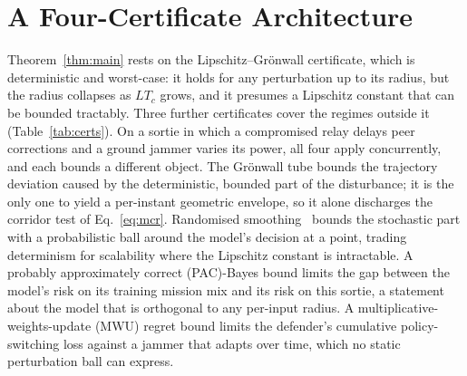 \documentclass[conference,letterpaper,10pt]{IEEEtran}   %
\begin{document}
\section{A Four-Certificate Architecture}
\label{sec:certs}
Theorem~\ref{thm:main} rests on the Lipschitz--Gr\"onwall certificate, which is
deterministic and worst-case: it holds for any perturbation up to its radius,
but the radius collapses as $LT_c$ grows, and it presumes a Lipschitz constant
that can be bounded tractably. Three further certificates cover the regimes
outside it (Table~\ref{tab:certs}). On a sortie in which a compromised relay
delays peer corrections and a ground jammer varies its power, all four apply
concurrently, and each bounds a different object. The Gr\"onwall tube bounds
the trajectory deviation caused by the deterministic, bounded part of the
disturbance; it is the only one to yield a per-instant geometric envelope, so it
alone discharges the corridor test of Eq.~\eqref{eq:mcr}. Randomised
smoothing~\cite{cohen2019smoothing} bounds the stochastic part with a
probabilistic ball around the model's decision at a point, trading determinism
for scalability where the Lipschitz constant is intractable. A probably
approximately correct (PAC)-Bayes bound limits the gap between the model's risk
on its training mission mix and its risk on this sortie, a statement about the
model that is orthogonal to any per-input radius. A multiplicative-weights-update
(MWU) regret bound limits the defender's cumulative policy-switching loss
against a jammer that adapts over time, which no static perturbation ball can
express.
\end{document}
